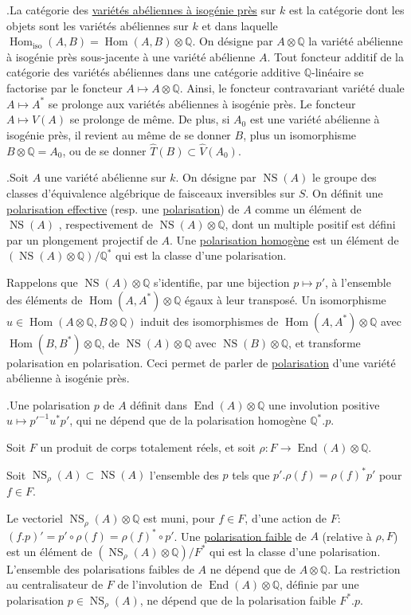 \documentclass[10pt]{article}
\newcommand{\Q}{\mathbb Q}
\newcommand{\Hom}{\operatorname{Hom}}
\newcommand{\End}{\operatorname{End}}
\newcommand{\NS}{\operatorname{NS}}
\begin{document}
.\quad La catégorie des \uline{variétés abéliennes à isogénie près} sur $k$ est la catégorie dont les objets sont les variétés abéliennes sur $k$ et dans laquelle $\Hom_{\mathrm{iso}}(A,B)=\Hom(A,B)\otimes\Q$. On désigne par $A\otimes\Q$ la variété abélienne à isogénie près \textquotedbl{}sous-jacente\textquotedbl{} à une variété abélienne $A$. Tout foncteur additif de la catégorie des variétés abéliennes dans une catégorie additive $\Q$-linéaire se factorise par le foncteur $A\mapsto A\otimes\Q$. Ainsi, le foncteur contravariant \textquotedbl{}variété duale\textquotedbl{} $A\mapsto A^*$ se prolonge aux variétés abéliennes à isogénie près. Le foncteur $A\mapsto\widehat V(A)$ se prolonge de même. De plus, si $A_0$ est une variété abélienne à isogénie près, il revient au même de se donner $B$, plus un isomorphisme $B\otimes\Q=A_0$, ou de se donner $\widehat T(B)\subset\widehat V(A_0)$.

.\quad Soit $A$ une variété abélienne sur $k$. On désigne par $\NS(A)$ le groupe des classes d'équivalence algébrique de faisceaux inversibles sur $S$. On définit une \uline{polarisation effective} (resp. une \uline{polarisation}) de $A$ comme un élément de $\NS(A)$%
, respectivement de $\NS(A)\otimes\Q$, dont un multiple positif est défini par un plongement projectif de $A$. Une \uline{polarisation homogène} est un élément de $(\NS(A)\otimes\Q)/\Q^*$ qui est la classe d'une polarisation.

Rappelons que $\NS(A)\otimes\Q$ s'identifie, par une bijection $p\mapsto p'$, à l'ensemble des éléments de $\Hom(A,A^*)\otimes\Q$ égaux à leur transposé. Un isomorphisme $u\in\Hom(A\otimes\Q,B\otimes\Q)$ induit des isomorphismes de $\Hom(A,A^*)\otimes\Q$ avec $\Hom(B,B^*)\otimes\Q$, de $\NS(A)\otimes\Q$ avec $\NS(B)\otimes\Q$, et transforme polarisation en polarisation. Ceci permet de parler de \uline{polarisation} d'une variété abélienne à isogénie près.

.\quad Une polarisation $p$ de $A$ définit dans $\End(A)\otimes\Q$ une involution positive $u\longmapsto p'^{-1}u^*p'$, qui ne dépend que de la polarisation homogène $\Q^*.p$.

Soit $F$ un produit de corps totalement réels, et soit $\rho:F\longrightarrow\End(A)\otimes\Q$.

Soit $\NS_\rho(A)\subset\NS(A)$ l'ensemble des $p$ tels que $p'.\rho(f)=\rho(f)^*p'$ pour $f\in F$.

Le vectoriel $\NS_\rho(A)\otimes\Q$ est muni, pour $f\in F$, d'une action de $F$: $(f.p)'=p'\circ\rho(f)=\rho(f)^*\circ p'$. Une \uline{polarisation faible} de $A$ (relative à $\rho,F$) est un élément de $(\NS_\rho(A)\otimes\Q)/F^*$ qui est la classe d'une polarisation. L'ensemble des polarisations faibles de $A$ ne dépend que de $A\otimes\Q$. La restriction au centralisateur de $F$ de l'involution de $\End(A)\otimes\Q$, définie par une polarisation $p\in\NS_\rho(A)$, ne dépend que de la polarisation faible $F^*.p$.
\end{document}
